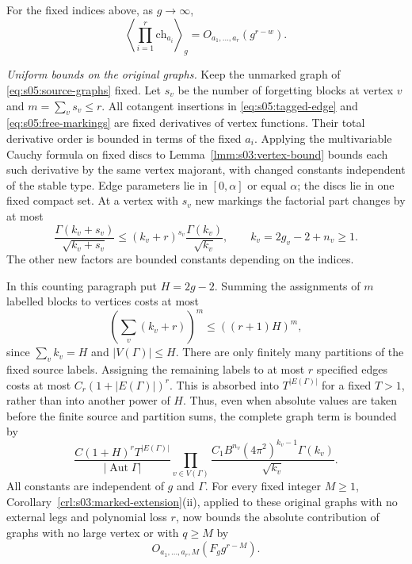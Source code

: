 \begin{lmm}\label{lmm:s05:character-filtration}
For the fixed indices above, as $g\to\infty$,
\begin{equation}\label{eq:s05:character-bound}
 \left\langle\prod_{i=1}^r\mathrm{ch}_{a_i}\right\rangle_g
       =O_{a_1,\ldots,a_r}(g^{r-w}).
\end{equation}
\end{lmm}
\begin{prf}
\emph{Uniform bounds on the original graphs.}
Keep the unmarked graph of \eqref{eq:s05:source-graphs} fixed.
Let $s_v$ be the number of forgetting blocks at vertex $v$ and
$m=\sum_v s_v\leq r$. All cotangent insertions in
\eqref{eq:s05:tagged-edge} and \eqref{eq:s05:free-markings} are
fixed derivatives of vertex functions. Their total derivative order
is bounded in terms of the fixed $a_i$. Applying the multivariable
Cauchy formula on fixed discs to
Lemma~\ref{lmm:s03:vertex-bound} bounds each such derivative by the
same vertex majorant, with changed constants independent of the
stable type. Edge parameters lie in $[0,\alpha]$ or equal $\alpha$;
the discs lie in one fixed compact set. At a vertex with $s_v$ new
markings the factorial part changes by at most
\[
 \frac{\Gamma(k_v+s_v)}{\sqrt{k_v+s_v}}
 \leq(k_v+r)^{s_v}\frac{\Gamma(k_v)}{\sqrt{k_v}},
 \qquad k_v=2g_v-2+n_v\geq1.
\]
The other new factors are bounded constants depending on the indices.

In this counting paragraph put $H=2g-2$. Summing the assignments of
$m$ labelled blocks to vertices costs at most
\[
 \left(\sum_v(k_v+r)\right)^m
 \leq((r+1)H)^m,
\]
since $\sum_v k_v=H$ and $|V(\Gamma)|\leq H$.
There are only finitely many partitions of the fixed source labels.
Assigning the remaining labels to at most $r$ specified edges costs
at most $C_r(1+|E(\Gamma)|)^r$. This is absorbed into
$T^{|E(\Gamma)|}$ for a fixed $T>1$, rather than into another power
of $H$. Thus, even when absolute values are taken before the finite
source and partition sums, the complete graph term is bounded by
\begin{equation}\label{eq:s05:source-majorant}
 \frac{C(1+H)^rT^{|E(\Gamma)|}}{|\operatorname{Aut}\Gamma|}
 \prod_{v\in V(\Gamma)}
 \frac{C_1B^{n_v}(4\pi^2)^{k_v-1}\Gamma(k_v)}{\sqrt{k_v}}.
\end{equation}
All constants are independent of $g$ and $\Gamma$.
For every fixed integer $M\geq1$,
Corollary~\ref{crl:s03:marked-extension}\textup{(ii)}, applied to
these original graphs with no external legs and polynomial loss $r$,
now bounds the absolute contribution of graphs with no large vertex
or with $q\geq M$ by
\begin{equation}\label{eq:s05:source-tail}
 O_{a_1,\ldots,a_r,M}(F_g g^{r-M}).
\end{equation}


\end{prf}
